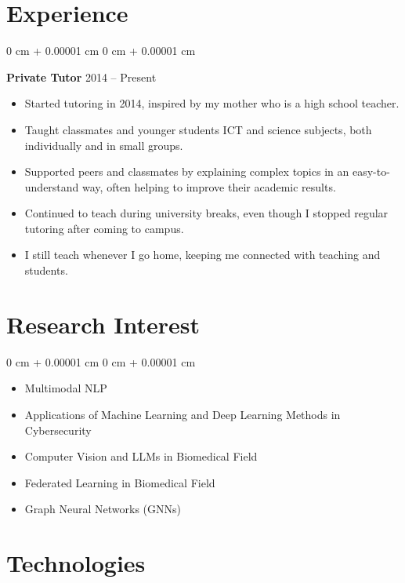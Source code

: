\documentclass[10pt, letterpaper]{article}
\newenvironment{highlightsforbulletentries}{
    \begin{itemize}[
        topsep=0.10 cm,
        parsep=0.10 cm,
        partopsep=0pt,
        itemsep=0pt,
        leftmargin=10pt
    ]
}{
    \end{itemize}
} %
\newenvironment{onecolentry}{
    \begin{adjustwidth}{
        0 cm + 0.00001 cm
    }{
        0 cm + 0.00001 cm
    }
}{
    \end{adjustwidth}
} %
\begin{document}
    \section{Experience}
    \begin{onecolentry}
            \textbf{Private Tutor} \hfill 2014 -- Present
        
        \begin{highlightsforbulletentries}
            \item Started tutoring in 2014, inspired by my mother who is a high school teacher. 
            \item Taught classmates and younger students ICT and science subjects, both individually and in small groups. 
            \item Supported peers and classmates by explaining complex topics in an easy-to-understand way, often helping to improve their academic results. 
            \item Continued to teach during university breaks, even though I stopped regular tutoring after coming to campus. 
            \item I still teach whenever I go home, keeping me connected with teaching and students. 
        \end{highlightsforbulletentries}
    \end{onecolentry}


    \section{Research Interest} 
        \begin{onecolentry}
            \begin{highlightsforbulletentries}
                \item Multimodal NLP
                \item Applications of Machine Learning and Deep Learning Methods in Cybersecurity
                \item Computer Vision and LLMs in Biomedical Field
                \item Federated Learning in Biomedical Field
                \item Graph Neural Networks (GNNs)                
            \end{highlightsforbulletentries}
        \end{onecolentry}


    \section{Technologies}
    
\end{document}

